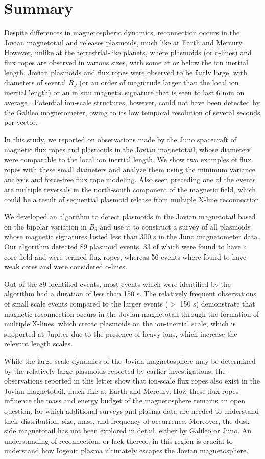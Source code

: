 \section{Summary}

Despite differences in magnetospheric dynamics, reconnection occurs in the Jovian magnetotail and releases plasmoids, much like at Earth and Mercury. However, unlike at the terrestrial‐like planets, where plasmoids (or o‐lines) and flux ropes are observed in various sizes, with some at or below the ion inertial length, Jovian plasmoids and flux ropes were observed to be fairly large, with diameters of several $R_J$ (or an order of magnitude larger than the local ion inertial length) or an in situ magnetic signature that is seen to last 6 min on average \cite{Vogt2014}. Potential ion‐scale structures, however, could not have been detected by the Galileo magnetometer, owing to its low temporal resolution of several seconds per vector.

In this study, we reported on observations made by the Juno spacecraft of magnetic flux ropes and plasmoids in the Jovian magnetotail, whose diameters were comparable to the local ion inertial length. We show two examples of flux ropes with these small diameters and analyze them using the minimum variance analysis and force-free flux rope modeling. Also seen preceding one of the events are multiple reversals in the north‐south component of the magnetic field, which could be a result of sequential plasmoid release from multiple X‐line reconnection. 

We developed an algorithm to detect plasmoids in the Jovian magnetotail based on the bipolar variation in $B_\theta$ and use it to construct a survey of all plasmoids whose magnetic signatures lasted less than 300 s in the Juno magnetometer data. Our algorithm detected 89 plasmoid events, 33 of which were found to have a core field and were termed flux ropes, whereas 56 events where found to have weak cores and were considered o-lines. 

Out of the 89 identified events, most events which were identified by the algorithm had a duration of less than 150 s. The relatively frequent observations of small scale events compared to the larger events ($>$ 150 s) demonstrate that magnetic reconnection occurs in the Jovian magnetotail through the formation of multiple X-lines, which create plasmoids on the ion-inertial scale, which is supported at Jupiter due to the presence of heavy ions, which increase the relevant length scales. 

While the large‐scale dynamics of the Jovian magnetosphere may be determined by the relatively large plasmoids reported by earlier investigations, the observations reported in this letter show that ion‐scale flux ropes also exist in the Jovian magnetotail, much like at Earth and Mercury. How these flux ropes influence the mass and energy budget of the magnetosphere remains an open question, for which additional surveys and plasma data are needed to understand their distribution, size, mass, and frequency of occurrence. Moreover, the dusk‐side magnetotail has not been explored in detail, either by Galileo or Juno. An understanding of reconnection, or lack thereof, in this region is crucial to understand how Iogenic plasma ultimately escapes the Jovian magnetosphere.
